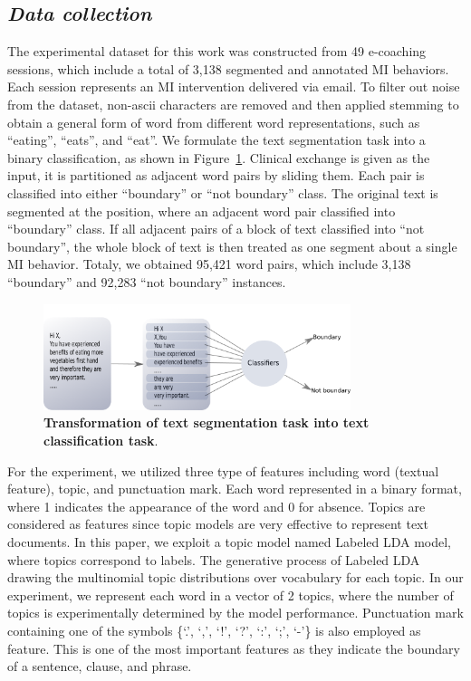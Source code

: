 \documentclass{amia}
\begin{document}
\subsection*{\textit{Data collection}}
The experimental dataset for this work was constructed from 49 e-coaching sessions, which include a total of 3,138 segmented and annotated MI behaviors. Each session represents an MI intervention delivered via email. To filter out noise from the dataset, non-ascii characters are removed and then applied stemming to obtain a general form of word from different word representations, such as ``eating'', ``eats'', and ``eat''. We formulate the text segmentation task into a binary classification, as shown in Figure~\ref{fig:classifier}. Clinical exchange is given as the input, it is partitioned as adjacent word pairs by sliding them. Each pair is classified into either ``boundary'' or ``not boundary'' class. The original text is segmented at the position, where an adjacent word pair classified into ``boundary'' class. If all adjacent pairs of a block of text classified into ``not boundary'', the whole block of text is then treated as one segment about a single MI behavior. Totaly, we obtained 95,421 word pairs, which include 3,138 ``boundary'' and 92,283 ``not boundary'' instances.    


\begin{figure}[!htb]
    \centering
    \includegraphics[width=0.80\textwidth]{figures/classifier.png}
    \caption{\textbf{Transformation of text segmentation task into text classification task}.}
    \label{fig:classifier}
\end{figure}


For the experiment, we utilized three type of features including word (textual feature), topic, and punctuation mark. Each word represented in a binary format, where 1 indicates the appearance of the word and 0 for absence. Topics are considered as features since topic models are very effective\cite{kotov2015interpretable,hashimoto2016topic,lu2016modeling} to represent text documents. In this paper, we exploit a topic model named Labeled LDA\cite{ramage2009labeled} model, where topics correspond to labels. The generative process of Labeled LDA drawing the multinomial topic distributions over vocabulary for each topic. In our experiment, we represent each word in a vector of 2 topics, where the number of topics is experimentally determined by the model performance\cite{kotov2015interpretable}. Punctuation mark containing one of the symbols \{`.', `,', `!', `?', `:', `;', `-'\} is also employed as feature. This is one of the most important features as they indicate the boundary of a sentence, clause, and phrase.   
\end{document}
